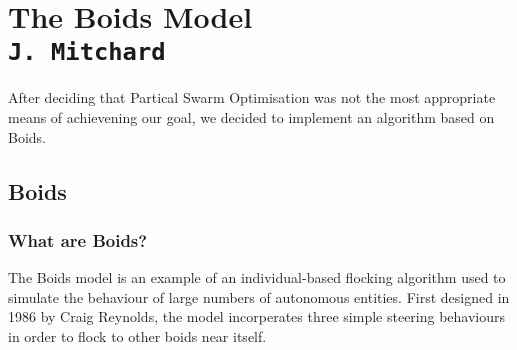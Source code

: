 \section{The Boids Model\\{\small\tt J.~Mitchard}}
After deciding that Partical Swarm Optimisation was not the most appropriate means of achievening our goal, we decided to implement an algorithm based on Boids.

\subsection{Boids}
\subsubsection{What are Boids?}
The Boids model is an example of an individual-based flocking algorithm used to simulate the behaviour of large numbers of autonomous entities. First designed in 1986 by Craig Reynolds, the model incorperates three simple steering behaviours in order to flock to other boids near itself.

